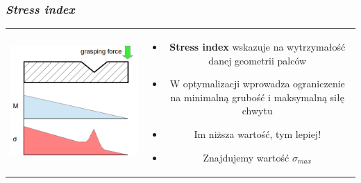 \documentclass[12pt,a4paper,portrait]{beamer}
\begin{document}
\begin{frame}
\frametitle{\textit{Stress index}}
\begin{tabular}{cc}
\begin{minipage}{0.5\textwidth}
\includegraphics[width=1\textwidth]{images/stress}
\end{minipage}
 &
\begin{minipage}{0.5\textwidth}
\begin{itemize}
\item \textbf{Stress index} wskazuje na wytrzymałość danej geometrii palców
\item W optymalizacji wprowadza ograniczenie na minimalną grubość i maksymalną siłę chwytu
\item Im niższa wartość, tym lepiej!
\item Znajdujemy wartość $\sigma_{max}$
\end{itemize}
\end{minipage}

\end{tabular}
\end{frame}
\end{document}
